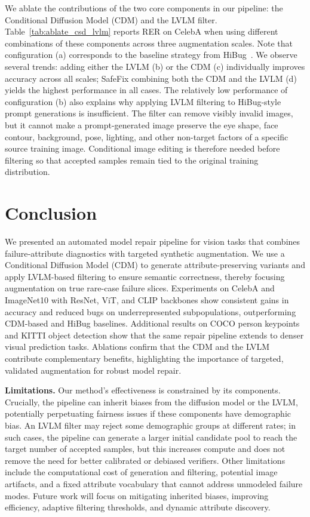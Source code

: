 \documentclass[10pt]{article} %
\newcommand{\model}{SafeFix\xspace}
\newcommand{\hibug}{HiBug\xspace}
\begin{document}
We ablate the contributions of the two core components in our pipeline: the Conditional Diffusion Model (CDM) and the LVLM filter. Table~\ref{tab:ablate_csd_lvlm} reports RER on CelebA when using different combinations of these components across three augmentation scales. Note that configuration (a) corresponds to the baseline strategy from \hibug~\citep{chen2023hibug}. We observe several trends: adding either the LVLM (b) or the CDM (c) individually improves accuracy across all scales; \model{} combining both the CDM and the LVLM (d) yields the highest performance in all cases. The relatively low performance of configuration (b) also explains why applying LVLM filtering to HiBug-style prompt generations is insufficient. The filter can remove visibly invalid images, but it cannot make a prompt-generated image preserve the eye shape, face contour, background, pose, lighting, and other non-target factors of a specific source training image. Conditional image editing is therefore needed before filtering so that accepted samples remain tied to the original training distribution.

\section{Conclusion}

We presented an automated model repair pipeline for vision tasks that combines failure‐attribute diagnostics with targeted synthetic augmentation. We use a Conditional Diffusion Model (CDM) to generate attribute-preserving variants and apply LVLM-based filtering to ensure semantic correctness, thereby focusing augmentation on true rare-case failure slices. Experiments on CelebA and ImageNet10 with ResNet, ViT, and CLIP backbones show consistent gains in accuracy and reduced bugs on underrepresented subpopulations, outperforming CDM-based and \hibug{} baselines. Additional results on COCO person keypoints and KITTI object detection show that the same repair pipeline extends to denser visual prediction tasks. Ablations confirm that the CDM and the LVLM contribute complementary benefits, highlighting the importance of targeted, validated augmentation for robust model repair.

\noindent\textbf{Limitations.}
Our method’s effectiveness is constrained by its components. Crucially, the pipeline can inherit biases from the diffusion model or the LVLM, potentially perpetuating fairness issues if these components have demographic bias. An LVLM filter may reject some demographic groups at different rates; in such cases, the pipeline can generate a larger initial candidate pool to reach the target number of accepted samples, but this increases compute and does not remove the need for better calibrated or debiased verifiers. Other limitations include the computational cost of generation and filtering, potential image artifacts, and a fixed attribute vocabulary that cannot address unmodeled failure modes. Future work will focus on mitigating inherited biases, improving efficiency, adaptive filtering thresholds, and dynamic attribute discovery.
\end{document}
